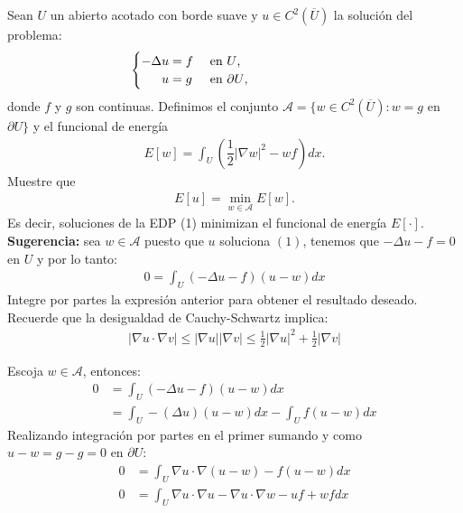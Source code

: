 \begin{homeworkProblem}
  Sean $U$ un abierto acotado con borde suave y $u \in C^{2}(\overline{U})$ la solución del problema:
  \begin{align*}
    \hspace{-6cm}(1)\hspace{3cm}\begin{cases}
      -\Delta u=f &\text{ en $U$,}\\
      \phantom{-\Delta} u=g &\text{ en $\partial U$,}
    \end{cases}
  \end{align*}
  donde $f$ y $g$ son continuas. Definimos el conjunto $\mathcal{A} = \{ w \in C^{2}(\overline{U}): w = g$ en $\partial U \}$ y el funcional de energía
  \begin{align*}
    E[w] = \int _{U} \left(\dfrac{1}{2} |\nabla w|^{2} - wf\right) dx.
  \end{align*}
  Muestre que 
  \begin{align*}
    E[u] = \min_{w \in \mathcal{A}} E[w].
  \end{align*}
  Es decir, soluciones de la EDP (1) minimizan el funcional de energía $E[\cdot]$.\\
  \textbf{Sugerencia:} sea $w\in \mathcal{A}$ puesto que $u$ soluciona $(1)$, tenemos que $-\Delta u -f=0$ en $U$ y por lo tanto:
  \begin{align*}
    0=\int_{U}(-\Delta u - f)(u-w)dx
  \end{align*}
  Integre por partes la expresión anterior para obtener el resultado deseado. Recuerde que la desigualdad de Cauchy-Schwartz implica:
  \begin{align*}
    |\nabla u \cdot \nabla v|\leq |\nabla u||\nabla v|\leq \frac{1}{2}|\nabla u|^2+\frac{1}{2}|\nabla v|
  \end{align*}
  \begin{solucion}
    Escoja $w\in\mathcal{A}$, entonces:
    \begin{align*}
      0&=\int_{U}(-\Delta u-f)(u-w)dx\\
      &=\int_{U}-(\Delta u)(u-w)dx - \int_{U}f(u-w)dx
    \end{align*}
    Realizando integración por partes en el primer sumando y como $u-w=g-g=0$ en $\partial U$:
    \begin{align*}
      0&=\int_{U}\nabla u \cdot \nabla(u-w)-f(u-w)dx\\
      0&=\int_{U}\nabla u \cdot \nabla u-\nabla u\cdot \nabla w-uf+wfdx\\ 

\end{align*}
\end{solucion}
\end{homeworkProblem}
